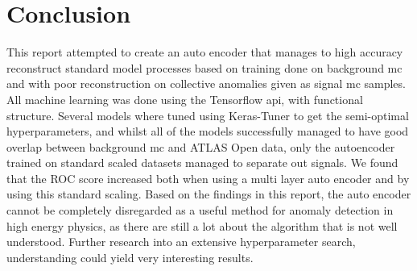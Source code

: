 \documentclass[ reprint, amsmath,amssymb, aps, nofootinbib]{revtex4-2}
\begin{document}
\section{Conclusion}
This report attempted to create an auto encoder that manages to high accuracy reconstruct standard model processes based on training done on background mc and with poor reconstruction on collective anomalies given as signal mc samples. All machine learning was done using the Tensorflow api, with functional structure. Several models where tuned using Keras-Tuner to get the semi-optimal hyperparameters, and whilst all of the models successfully managed to have good overlap between background mc and ATLAS Open data, only the autoencoder trained on standard scaled datasets managed to separate out signals. We found that the ROC score increased both when using a multi layer auto encoder and by using this standard scaling. Based on the findings in this report, the auto encoder cannot be completely disregarded as a useful method for anomaly detection in high energy physics, as there are still a lot about the algorithm that is not well understood. Further research into an extensive hyperparameter search, understanding could yield very interesting results. 



\mbox{~}
\onecolumngrid
\printbibliography

\newpage
\appendix
\end{document}
